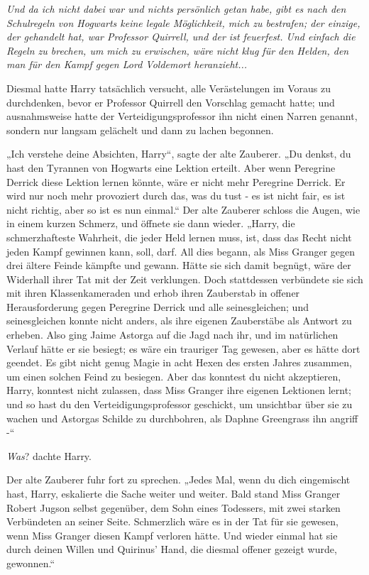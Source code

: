 {\emph{Und da ich nicht dabei war und nichts persönlich getan habe, gibt es nach den Schulregeln von Hogwarts keine legale Möglichkeit, mich zu bestrafen; der einzige, der gehandelt hat, war Professor Quirrell, und der ist feuerfest. Und einfach die Regeln zu brechen, um mich zu erwischen, wäre nicht klug für den Helden, den man für den Kampf gegen Lord Voldemort heranzieht...}

Diesmal hatte Harry tatsächlich versucht, alle Verästelungen im Voraus zu durchdenken, bevor er Professor Quirrell den Vorschlag gemacht hatte; und ausnahmsweise hatte der Verteidigungsprofessor ihn nicht einen Narren genannt, sondern nur langsam gelächelt und dann zu lachen begonnen.

„Ich verstehe deine Absichten, Harry“, sagte der alte Zauberer. „Du denkst, du hast den Tyrannen von Hogwarts eine Lektion erteilt. Aber wenn Peregrine Derrick diese Lektion lernen könnte, wäre er nicht mehr Peregrine Derrick. Er wird nur noch mehr provoziert durch das, was du tust - es ist nicht fair, es ist nicht richtig, aber so ist es nun einmal.“ Der alte Zauberer schloss die Augen, wie in einem kurzen Schmerz, und öffnete sie dann wieder. „Harry, die schmerzhafteste Wahrheit, die jeder Held lernen muss, ist, dass das Recht nicht jeden Kampf gewinnen kann, soll, darf. All dies begann, als Miss Granger gegen drei ältere Feinde kämpfte und gewann. Hätte sie sich damit begnügt, wäre der Widerhall ihrer Tat mit der Zeit verklungen. Doch stattdessen verbündete sie sich mit ihren Klassenkameraden und erhob ihren Zauberstab in offener Herausforderung gegen Peregrine Derrick und alle seinesgleichen; und seinesgleichen konnte nicht anders, als ihre eigenen Zauberstäbe als Antwort zu erheben. Also ging Jaime Astorga auf die Jagd nach ihr, und im natürlichen Verlauf hätte er sie besiegt; es wäre ein trauriger Tag gewesen, aber es hätte dort geendet. Es gibt nicht genug Magie in acht Hexen des ersten Jahres zusammen, um einen solchen Feind zu besiegen. Aber das konntest du nicht akzeptieren, Harry, konntest nicht zulassen, dass Miss Granger ihre eigenen Lektionen lernt; und so hast du den Verteidigungsprofessor geschickt, um unsichtbar über sie zu wachen und Astorgas Schilde zu durchbohren, als Daphne Greengrass ihn angriff -“

\emph{Was}? dachte Harry.

Der alte Zauberer fuhr fort zu sprechen. „Jedes Mal, wenn du dich eingemischt hast, Harry, eskalierte die Sache weiter und weiter. Bald stand Miss Granger Robert Jugson selbst gegenüber, dem Sohn eines Todessers, mit zwei starken Verbündeten an seiner Seite. Schmerzlich wäre es in der Tat für sie gewesen, wenn Miss Granger diesen Kampf verloren hätte. Und wieder einmal hat sie durch deinen Willen und Quirinus' Hand, die diesmal offener gezeigt wurde, gewonnen.“

}
